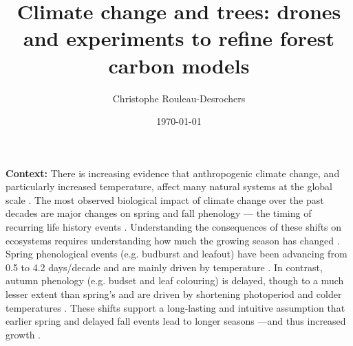 \documentclass[12pt]{article}
\title{Climate change and trees: drones and experiments to refine forest carbon models}
\date{\today}
\author{Christophe Rouleau-Desrochers}
\begin{document}

\maketitle
\textbf {Context:} There is increasing evidence that anthropogenic climate change, and particularly increased temperature, affect many natural systems at the global scale \citep{parmesan_poleward_1999,rosenzweig_attributing_2008}. The most observed biological impact of climate change over the past decades are major changes on spring and fall phenology --- the timing of recurring life history events \citep{parmesan_globally_2003}. Understanding the consequences of these shifts on ecosystems requires understanding how much the growing season has changed \citep{duputie_phenological_2015}. Spring phenological events (e.g. budburst and leafout) have been advancing from 0.5 \citep{wolfe_climate_2005} to 4.2 days/decade \citep{chmielewski_response_2001,fu_recent_2014} and are mainly driven by temperature \citep{chuine_why_2010,cleland_shifting_2007,penuelas_responses_2001}. In contrast, autumn phenology (e.g. budset and leaf colouring) is delayed, though to a much lesser extent than spring's \citep{gallinat_autumn_2015,jeong_macroscale_2014} and are driven by shortening photoperiod \citep{cooke_dynamic_2012,flynn_temperature_2018,korner_phenology_2010} and colder temperatures \citep{cooke_dynamic_2012,delpierre_temperate_2016}. These shifts support a long-lasting and intuitive assumption that earlier spring and delayed fall events lead to longer seasons ---and thus increased growth \citep{keenan_net_2014}. \\
\end{document}
